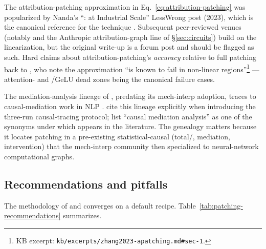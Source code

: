 \begin{forumsignal}
The attribution-patching approximation in
Eq.~\eqref{eq:attribution-patching} was popularized by Nanda's
``:  at Industrial Scale''
LessWrong post (2023), which is the canonical reference for the
technique . Subsequent
peer-reviewed venues (notably \citealt{conmy2023-acdc} and the
Anthropic attribution-graph line of \S\ref{sec:circuits}) build on
the linearization, but the original write-up is a forum post and
should be flagged as such. Hard claims about attribution-patching's
\emph{accuracy} relative to full patching back to
\citet[\S 1]{zhang2023-apatching}, who note the approximation
``is known to fail in non-linear regions''\footnote{KB excerpt:
\nolinkurl{kb/excerpts/zhang2023-apatching.md#sec-1}.} ---
attention-  and /GeLU dead zones being the
canonical failure cases.
\end{forumsignal}

The mediation-analysis lineage of , predating its
mech-interp adoption, traces to causal-mediation work in
NLP . \citet[\S 1]{meng2022-rome} cite
this lineage explicitly when introducing the three-run causal-tracing
protocol; \citet[\S 1]{zhang2023-apatching} list ``causal mediation
analysis'' as one of the synonyms under which 
appears in the literature. The genealogy matters because it locates
patching in a pre-existing statistical-causal 
(total/, mediation, intervention) that the
mech-interp community then specialized to neural-network
computational graphs.

\subsection{Recommendations and pitfalls}
\label{sec:patching-recommendations}

The methodology of \citet{zhang2023-apatching} and
\citet{heimersheim2024-apatching-howto} converges on a default recipe.
Table~\ref{tab:patching-recommendations} summarizes.

